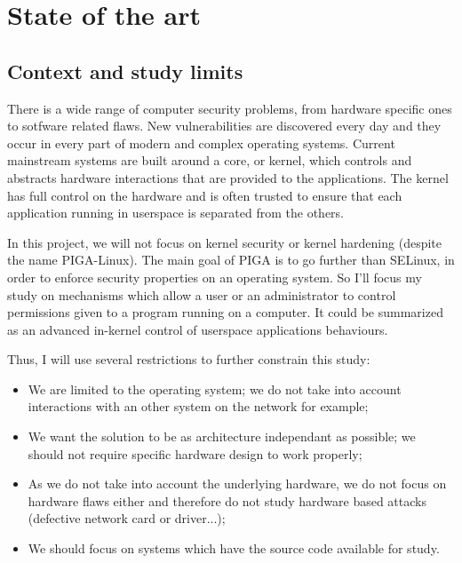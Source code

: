 \documentclass[pdftex,a4paper,titlepage,11pt]{article}
\begin{document}

\newpage

\section{State of the art}

\subsection{Context and study limits}


There is a wide range of computer security problems, from hardware specific ones to sotfware related flaws. New vulnerabilities are discovered every day and they occur in every part of modern and complex operating systems. Current mainstream systems are built around a core, or kernel, which controls and abstracts hardware interactions that are provided to the applications. The kernel has full control on the hardware and is often trusted to ensure that each application running in userspace is separated from the others.

\bigskip

In this project, we will not focus on kernel security or kernel hardening (despite the name PIGA-Linux). The main goal of PIGA is to go further than SELinux, in order to enforce security properties on an operating system. So I'll focus my study on mechanisms which allow a user or an administrator to control permissions given to a program running on a computer. It could be summarized as an advanced in-kernel control of userspace applications behaviours.

\bigskip

Thus, I will use several restrictions to further constrain this study:
\begin{itemize}
	\item We are limited to the operating system; we do not take into account interactions with an other system on the network for example;
	\item We want the solution to be as architecture independant as possible; we should not require specific hardware design to work properly;
	\item As we do not take into account the underlying hardware, we do not focus on hardware flaws either and therefore do not study hardware based attacks (defective network card or driver...);
	\item We should focus on systems which have the source code available for study.
\end{itemize}
\end{document}
